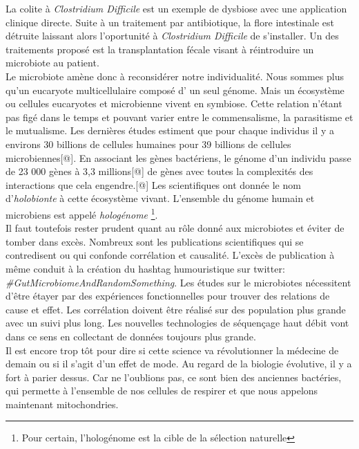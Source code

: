\documentclass[12pt,a4paper]{article}
\begin{document}
La colite à \textit{Clostridium Difficile} est un exemple de dysbiose avec une application clinique directe. Suite à un traitement par antibiotique, la flore intestinale est détruite laissant alors l'oportunité à \textit{Clostridium Difficile} de s'installer. Un des traitements proposé est la transplantation fécale visant à réintroduire un microbiote au patient. \\
Le microbiote amène donc à reconsidérer notre individualité. Nous sommes plus qu'un eucaryote multicellulaire composé d' un seul génome. Mais un écosystème ou cellules eucaryotes et microbienne vivent en symbiose. Cette relation n'étant pas figé dans le temps et pouvant varier entre le commensalisme, la parasitisme et le mutualisme. Les dernières études estiment que pour chaque individus il y a environs 30 billions de cellules humaines pour 39 billions de cellules microbiennes[@]. En associant les gènes bactériens, le génome d’un individu passe de 23 000 gènes à 3,3 millions[@] de gènes avec toutes la complexités des interactions que cela engendre.[@] Les scientifiques ont donnée le nom d’\textit{holobionte} à cette écosystème vivant. L'ensemble du génome humain et microbiens est appelé \textit{hologénome} \footnote{Pour certain, l'hologénome est la cible de la sélection naturelle}. \\
Il faut toutefois rester prudent quant au rôle donné aux microbiotes et éviter de tomber dans excès. Nombreux sont les publications scientifiques qui se contredisent ou qui confonde corrélation et causalité. L'excès de publication à même conduit à la création du hashtag humouristique sur twitter: \textit{\#GutMicrobiomeAndRandomSomething}. 
Les études sur le microbiotes nécessitent d'être étayer par des expériences fonctionnelles pour trouver des relations de cause et effet. Les corrélation doivent être réalisé sur des population plus grande avec un suivi plus long. Les nouvelles technologies de séquençage haut débit vont dans ce sens en collectant de données toujours plus grande. \\
Il est encore trop tôt pour dire si cette science va révolutionner la médecine de demain ou si il s'agit d'un effet de mode.
Au regard de la biologie évolutive, il y a fort à parier dessus. Car ne l'oublions pas, ce sont bien des anciennes bactéries, qui permette à l'ensemble de nos cellules de respirer et que nous appelons maintenant mitochondries.
\end{document}

